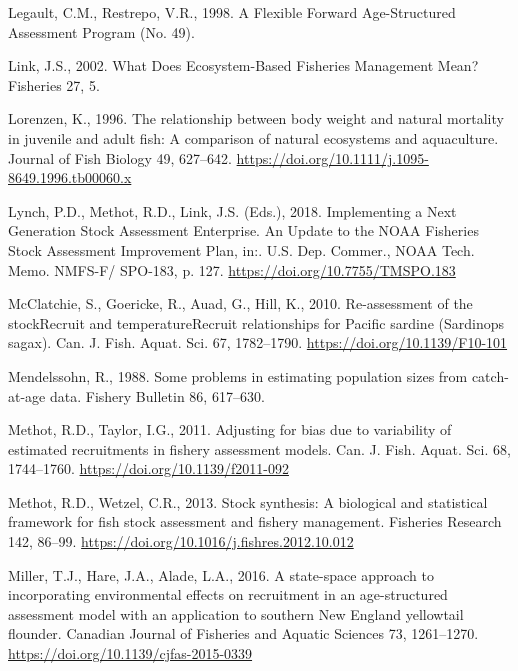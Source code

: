 \documentclass[]{article}
\begin{document}
\leavevmode\hypertarget{ref-legault1998Flexible}{}%
Legault, C.M., Restrepo, V.R., 1998. A Flexible Forward Age-Structured
Assessment Program (No. 49).

\leavevmode\hypertarget{ref-link2002What}{}%
Link, J.S., 2002. What Does Ecosystem-Based Fisheries Management Mean?
Fisheries 27, 5.

\leavevmode\hypertarget{ref-lorenzen1996Relationship}{}%
Lorenzen, K., 1996. The relationship between body weight and natural
mortality in juvenile and adult fish: A comparison of natural ecosystems
and aquaculture. Journal of Fish Biology 49, 627--642.
\url{https://doi.org/10.1111/j.1095-8649.1996.tb00060.x}

\leavevmode\hypertarget{ref-lynch2018Implementing}{}%
Lynch, P.D., Methot, R.D., Link, J.S. (Eds.), 2018. Implementing a Next
Generation Stock Assessment Enterprise. An Update to the NOAA Fisheries
Stock Assessment Improvement Plan, in:. U.S. Dep. Commer., NOAA Tech.
Memo. NMFS-F/ SPO-183, p. 127. \url{https://doi.org/10.7755/TMSPO.183}

\leavevmode\hypertarget{ref-mcclatchie2010Reassessment}{}%
McClatchie, S., Goericke, R., Auad, G., Hill, K., 2010. Re-assessment of
the stockRecruit and temperatureRecruit relationships for Pacific
sardine (Sardinops sagax). Can. J. Fish. Aquat. Sci. 67, 1782--1790.
\url{https://doi.org/10.1139/F10-101}

\leavevmode\hypertarget{ref-mendelssohn1988Problems}{}%
Mendelssohn, R., 1988. Some problems in estimating population sizes from
catch-at-age data. Fishery Bulletin 86, 617--630.

\leavevmode\hypertarget{ref-methot2011Adjusting}{}%
Methot, R.D., Taylor, I.G., 2011. Adjusting for bias due to variability
of estimated recruitments in fishery assessment models. Can. J. Fish.
Aquat. Sci. 68, 1744--1760. \url{https://doi.org/10.1139/f2011-092}

\leavevmode\hypertarget{ref-methot2013Stock}{}%
Methot, R.D., Wetzel, C.R., 2013. Stock synthesis: A biological and
statistical framework for fish stock assessment and fishery management.
Fisheries Research 142, 86--99.
\url{https://doi.org/10.1016/j.fishres.2012.10.012}

\leavevmode\hypertarget{ref-miller2016Statespace}{}%
Miller, T.J., Hare, J.A., Alade, L.A., 2016. A state-space approach to
incorporating environmental effects on recruitment in an age-structured
assessment model with an application to southern New England yellowtail
flounder. Canadian Journal of Fisheries and Aquatic Sciences 73,
1261--1270. \url{https://doi.org/10.1139/cjfas-2015-0339}
\end{document}
